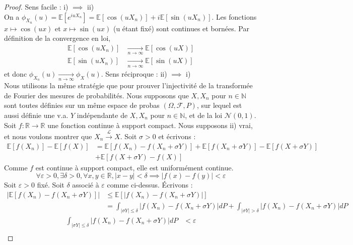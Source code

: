 \begin{proof}
Sens facile : i) $\implies$ ii) \\
On a $\phi_{X_n}(u) = \mathbb{E}[e^{iuX_n}] = \mathbb{E}[\cos(uX_n)] + i\mathbb{E}[\sin(uX_n)]$.
Les fonctions $x \mapsto \cos(ux)$ et $x \mapsto \sin(ux)$ (u étant fixé) sont continues et bornées. Par définition de la convergence en loi,
\begin{align*}
    \mathbb{E}[\cos(uX_n)] &\xrightarrow[n \to \infty]{} \mathbb{E}[\cos(uX)] \\
    \mathbb{E}[\sin(uX_n)] &\xrightarrow[n \to \infty]{} \mathbb{E}[\sin(uX)]
\end{align*}
et donc $\phi_{X_n}(u) \xrightarrow[n \to \infty]{} \phi_X(u)$.
\vspace{1cm}
Sens réciproque : ii) $\implies$ i) \\
Nous utilisons la même stratégie que pour prouver l'injectivité de la transformée de Fourier des mesures de probabilités. Nous supposons que $X, X_n$ pour $n \in \mathbb{N}$ sont toutes définies sur un même espace de probas $(\Omega, \mathcal{F}, P)$, sur lequel est aussi définie une v.a. $Y$ indépendante de $X, X_n$ pour $n \in \mathbb{N}$, et de la loi $\mathcal{N}(0,1)$.
Soit $f: \mathbb{R} \to \mathbb{R}$ une fonction continue à support compact. Nous supposons ii) vrai, et nous voulons montrer que $X_n \xrightarrow{\mathcal{L}} X$. Soit $\sigma > 0$ et écrivons :
\begin{align*}
    \mathbb{E}[f(X_n)] - \mathbb{E}[f(X)] &= \mathbb{E}[f(X_n) - f(X_n + \sigma Y)] + \mathbb{E}[f(X_n + \sigma Y)] - \mathbb{E}[f(X + \sigma Y)] \\
    &+ \mathbb{E}[f(X + \sigma Y) - f(X)]
\end{align*}
Comme $f$ est continue à support compact, elle est uniformément continue.
\[
\forall \varepsilon > 0, \exists \delta > 0, \forall x,y \in \mathbb{R}, |x-y| < \delta \implies |f(x) - f(y)| < \varepsilon
\]
Soit $\varepsilon > 0$ fixé. Soit $\delta$ associé à $\varepsilon$ comme ci-dessus. Écrivons :
\begin{align*}
    |\mathbb{E}[f(X_n) - f(X_n + \sigma Y)]| &\leq \mathbb{E}[|f(X_n) - f(X_n + \sigma Y)|] \\
    &= \int_{|\sigma Y| \leq \delta} |f(X_n) - f(X_n + \sigma Y)| dP + \int_{|\sigma Y| > \delta} |f(X_n) - f(X_n + \sigma Y)| dP
\end{align*}
\begin{align*}
    \int_{|\sigma Y| \leq \delta} |f(X_n) - f(X_n + \sigma Y)| dP &< \varepsilon \\

\end{align*}
\end{proof}
